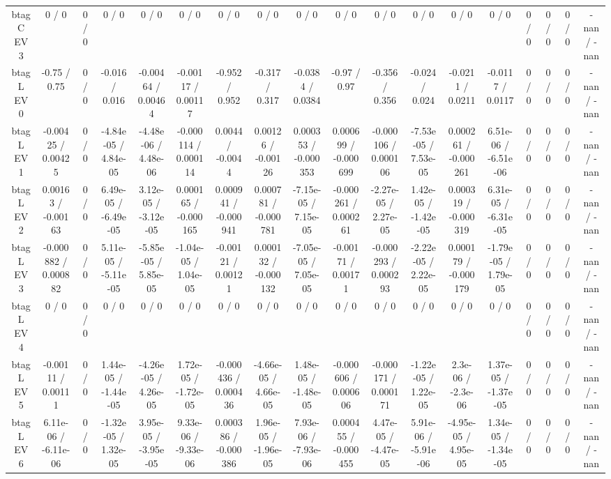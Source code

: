 \documentclass[10pt]{article}
\begin{document}
\begin{table}[htbp]
\begin{center}
\begin{tabular}{|c|c|c|c|c|c|c|c|c|c|c|c|c|c|c|c|c|c|}
  btag C EV 3 & 0 / 0 & 0 / 0 & 0 / 0 & 0 / 0 & 0 / 0 & 0 / 0 & 0 / 0 & 0 / 0 & 0 / 0 & 0 / 0 & 0 / 0 & 0 / 0 & 0 / 0 & 0 / 0 & 0 / 0 & 0 / 0 & -nan / -nan \\ 
  btag L EV 0 & -0.75 / 0.75 & 0 / 0 & -0.016 / 0.016 & -0.00464 / 0.00464 & -0.00117 / 0.00117 & -0.952 / 0.952 & -0.317 / 0.317 & -0.0384 / 0.0384 & -0.97 / 0.97 & -0.356 / 0.356 & -0.024 / 0.024 & -0.0211 / 0.0211 & -0.0117 / 0.0117 & 0 / 0 & 0 / 0 & 0 / 0 & -nan / -nan \\ 
  btag L EV 1 & -0.00425 / 0.00425 & 0 / 0 & -4.84e-05 / 4.84e-05 & -4.48e-06 / 4.48e-06 & -0.000114 / 0.000114 & 0.0044 / -0.0044 & 0.00126 / -0.00126 & 0.000353 / -0.000353 & 0.000699 / -0.000699 & -0.000106 / 0.000106 & -7.53e-05 / 7.53e-05 & 0.000261 / -0.000261 & 6.51e-06 / -6.51e-06 & 0 / 0 & 0 / 0 & 0 / 0 & -nan / -nan \\ 
  btag L EV 2 & 0.00163 / -0.00163 & 0 / 0 & 6.49e-05 / -6.49e-05 & 3.12e-05 / -3.12e-05 & 0.000165 / -0.000165 & 0.000941 / -0.000941 & 0.000781 / -0.000781 & -7.15e-05 / 7.15e-05 & -0.000261 / 0.000261 & -2.27e-05 / 2.27e-05 & 1.42e-05 / -1.42e-05 & 0.000319 / -0.000319 & 6.31e-05 / -6.31e-05 & 0 / 0 & 0 / 0 & 0 / 0 & -nan / -nan \\ 
  btag L EV 3 & -0.000882 / 0.000882 & 0 / 0 & 5.11e-05 / -5.11e-05 & -5.85e-05 / 5.85e-05 & -1.04e-05 / 1.04e-05 & -0.00121 / 0.00121 & 0.000132 / -0.000132 & -7.05e-05 / 7.05e-05 & -0.00171 / 0.00171 & -0.000293 / 0.000293 & -2.22e-05 / 2.22e-05 & 0.000179 / -0.000179 & -1.79e-05 / 1.79e-05 & 0 / 0 & 0 / 0 & 0 / 0 & -nan / -nan \\ 
  btag L EV 4 & 0 / 0 & 0 / 0 & 0 / 0 & 0 / 0 & 0 / 0 & 0 / 0 & 0 / 0 & 0 / 0 & 0 / 0 & 0 / 0 & 0 / 0 & 0 / 0 & 0 / 0 & 0 / 0 & 0 / 0 & 0 / 0 & -nan / -nan \\ 
  btag L EV 5 & -0.00111 / 0.00111 & 0 / 0 & 1.44e-05 / -1.44e-05 & -4.26e-05 / 4.26e-05 & 1.72e-05 / -1.72e-05 & -0.000436 / 0.000436 & -4.66e-05 / 4.66e-05 & 1.48e-05 / -1.48e-05 & -0.000606 / 0.000606 & -0.000171 / 0.000171 & -1.22e-05 / 1.22e-05 & 2.3e-06 / -2.3e-06 & 1.37e-05 / -1.37e-05 & 0 / 0 & 0 / 0 & 0 / 0 & -nan / -nan \\ 
  btag L EV 6 & 6.11e-06 / -6.11e-06 & 0 / 0 & -1.32e-05 / 1.32e-05 & 3.95e-05 / -3.95e-05 & 9.33e-06 / -9.33e-06 & 0.000386 / -0.000386 & 1.96e-05 / -1.96e-05 & 7.93e-06 / -7.93e-06 & 0.000455 / -0.000455 & 4.47e-05 / -4.47e-05 & 5.91e-06 / -5.91e-06 & -4.95e-05 / 4.95e-05 & 1.34e-05 / -1.34e-05 & 0 / 0 & 0 / 0 & 0 / 0 & -nan / -nan \\ 

\end{tabular}
\end{center}
\end{table}
\end{document}
